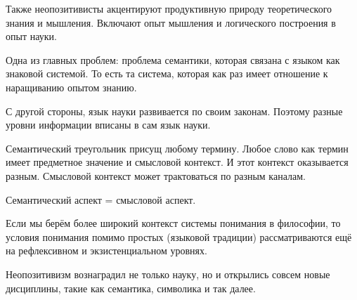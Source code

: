 \documentclass[main.tex]{subfiles}
\begin{document}
Также неопозитивисты акцентируют продуктивную природу теоретического знания и мышления.
Включают опыт мышления и логического построения в опыт науки.

Одна из главных проблем: проблема семантики, которая связана с языком как знаковой системой.
То есть та система, которая как раз имеет отношение к наращиванию опытом знанию.



С другой стороны, язык науки развивается по своим законам.
Поэтому разные уровни информации вписаны в сам язык науки.


Семантический треугольник присущ любому термину.
Любое слово как термин имеет предметное значение и смысловой контекст.
И этот контекст оказывается разным.
Смысловой контекст может трактоваться по разным каналам.

Семантический аспект = смысловой аспект.




Если мы берём более широкий контекст системы понимания в философии, то условия понимания помимо простых (языковой традиции) рассматриваются ещё на рефлексивном и экзистенциальном уровнях.

Неопозитивизм вознаградил не только науку, но и открылись совсем новые дисциплины, такие как семантика, символика и так далее.
\end{document}
